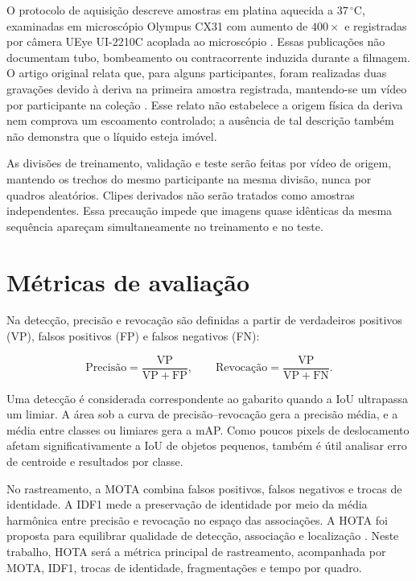 O protocolo de aquisição descreve amostras em platina aquecida a $37\,^{\circ}\mathrm{C}$, examinadas em microscópio Olympus CX31 com aumento de $400\times$ e registradas por câmera UEye UI-2210C acoplada ao microscópio \cite{haugen2019visem,thambawita2023visemtracking}. Essas publicações não documentam tubo, bombeamento ou contracorrente induzida durante a filmagem. O artigo original relata que, para alguns participantes, foram realizadas duas gravações devido à deriva na primeira amostra registrada, mantendo-se um vídeo por participante na coleção \cite{haugen2019visem}. Esse relato não estabelece a origem física da deriva nem comprova um escoamento controlado; a ausência de tal descrição também não demonstra que o líquido esteja imóvel.

As divisões de treinamento, validação e teste serão feitas por vídeo de origem, mantendo os trechos do mesmo participante na mesma divisão, nunca por quadros aleatórios. Clipes derivados não serão tratados como amostras independentes. Essa precaução impede que imagens quase idênticas da mesma sequência apareçam simultaneamente no treinamento e no teste.

\section{Métricas de avaliação}

Na detecção, precisão e revocação são definidas a partir de verdadeiros positivos (VP), falsos positivos (FP) e falsos negativos (FN):

\begin{equation}
	\text{Precisão}=\frac{\mathrm{VP}}{\mathrm{VP}+\mathrm{FP}},
	\qquad
	\text{Revocação}=\frac{\mathrm{VP}}{\mathrm{VP}+\mathrm{FN}}.
\end{equation}

Uma detecção é considerada correspondente ao gabarito quando a \ac{IoU} ultrapassa um limiar. A área sob a curva de precisão--revocação gera a precisão média, e a média entre classes ou limiares gera a \ac{mAP}. Como poucos pixels de deslocamento afetam significativamente a IoU de objetos pequenos, também é útil analisar erro de centroide e resultados por classe.

No rastreamento, a \ac{MOTA} combina falsos positivos, falsos negativos e trocas de identidade. A \ac{IDF1} mede a preservação de identidade por meio da média harmônica entre precisão e revocação no espaço das associações. A \ac{HOTA} foi proposta para equilibrar qualidade de detecção, associação e localização \cite{luiten2021hota}. Neste trabalho, HOTA será a métrica principal de rastreamento, acompanhada por MOTA, IDF1, trocas de identidade, fragmentações e tempo por quadro.

